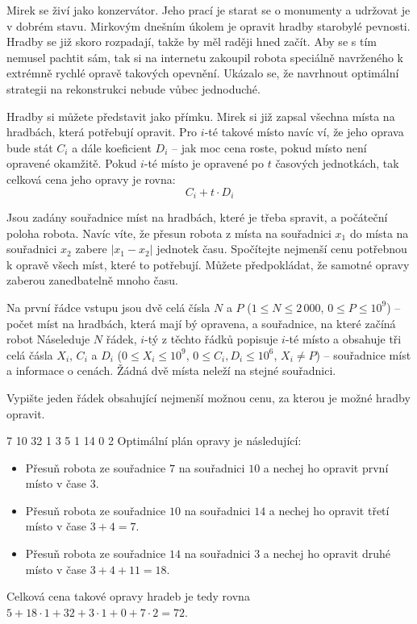 





Mirek se živí jako konzervátor.
Jeho prací je starat se o monumenty a udržovat je v dobrém stavu.
Mirkovým dnešním úkolem je opravit hradby starobylé pevnosti.
Hradby se již skoro rozpadají, takže by měl raději hned začít.
Aby se s tím nemusel pachtit sám, tak si na internetu zakoupil robota
speciálně navrženého k extrémně rychlé opravě takových opevnění.
Ukázalo se, že navrhnout optimální strategii na rekonstrukci nebude vůbec jednoduché.

Hradby si můžete představit jako přímku.
Mirek si již zapsal všechna místa na hradbách, která potřebují opravit.
Pro $i$-té takové místo navíc ví, že jeho oprava bude stát $C_i$
a dále koeficient $D_i$ -- jak moc cena roste, pokud místo není opravené okamžitě.
Pokud $i$-té místo je opravené po $t$ časových jednotkách,
tak celková cena jeho opravy je rovna:
\[ C_i + t \cdot D_i \]


Jsou zadány souřadnice míst na hradbách, které je třeba spravit,
a počáteční poloha robota.
  Navíc víte, že přesun robota z místa na souřadnici $x_1$ do místa na souřadnici $x_2$
zabere $|x_1 - x_2|$ jednotek času.
Spočítejte nejmenší cenu potřebnou k opravě všech míst, které to potřebují.
Můžete předpokládat, že samotné opravy zaberou zanedbatelně mnoho času.


Na první řádce vstupu jsou dvě celá čísla $N$ a $P$
($1 \le N \le 2\,000$, $0 \le P \le 10^9$)
-- počet míst na hradbách, která mají bý opravena, a souřadnice,
na které začíná robot
Náseleduje $N$ řádek, $i$-tý z těchto řádků popisuje $i$-té místo
a obsahuje tři celá čásla $X_i$, $C_i$ a $D_i$
($0 \le X_i \le 10^9$, $0 \le C_i, D_i \le 10^6$, $X_i \neq P$)
-- souřadnice míst a informace o cenách.
Žádná dvě místa neleží na stejné souřadnici.


Vypište jeden řádek obsahující nejmenší možnou cenu,
za kterou je možné hradby opravit.



 7
10 32 1
3 5 1
14 0 2
\sampleCOMMENT
Optimální plán opravy je následující:
\begin{itemize}
	\item Přesuň robota ze souřadnice $7$ na souřadnici $10$ a nechej ho opravit první místo v čase $3$.
	\item Přesuň robota ze souřadnice $10$ na souřadnici $14$ a nechej ho opravit třetí místo v čase $3 + 4 = 7$.
	\item Přesuň robota ze souřadnice $14$ na souřadnici $3$ a nechej ho opravit druhé místo v čase $3 + 4 + 11 = 18$.
\end{itemize}
Celková cena takové opravy hradeb je tedy rovna\\
$5 + 18 \cdot 1 + 32 + 3 \cdot 1 + 0 + 7 \cdot 2 = 72$.
\sampleEND


